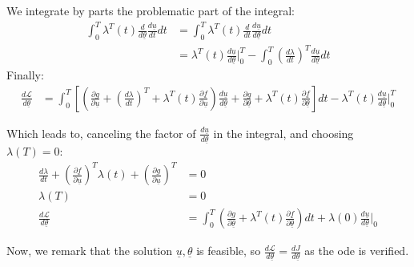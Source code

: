     We integrate by parts the problematic part of the integral:
\begin{align}
    \int_{0}^{T} \lambda^{T}(t) \frac{d}{d \underline{\theta}} \frac{d \underline{u}}{dt} dt &=
        \int_{0}^{T} \lambda^{T}(t) \frac{d}{dt} \frac{d \underline{u}}{d \underline{\theta}} dt \\
        &= \lambda^{T}(t)\frac{d \underline{u}}{d \underline{\theta}} \vert^{T}_{0} - \int_{0}^{T} \left( \frac{d \lambda}{dt} \right)^{T} \frac{d \underline{u}}{d \underline{\theta}} dt
\end{align}
Finally:
\begin{align}
    \frac{d \mathcal{L}}{d \underline{\theta}} &= \int_{0}^{T} \left[
        \left( \frac{\partial g}{\partial \underline{u}} + \left( \frac{d \lambda}{dt} \right)^{T} + \lambda^{T}(t) \frac{\partial \underline{f}}{\partial \underline{u}}\right) 
            \frac{d \underline{u}}{d \underline{\theta}} + \frac{\partial g}{\partial \underline{\theta}} + \lambda^{T}(t) \frac{\partial \underline{f}}{\partial \underline{\theta}} \right] dt
            - \lambda^{T}(t)\frac{d \underline{u}}{d \underline{\theta}} \vert^{T}_{0}
\end{align}

Which leads to, canceling the factor of $\frac{d \underline{u}}{d \underline{\theta}}$ in the integral, and choosing $\lambda(T)=0$:
\begin{align}
    \frac{d \lambda}{dt} + \left( \frac{\partial \underline{f}}{\partial \underline{u}}\right)^{T} \lambda(t) + \left( \frac{\partial g}{\partial \underline{u}}\right)^{T} &= 0 \\
    \lambda(T) &= 0 \\
    \frac{d \mathcal{L}}{d \underline{\theta}} &= \int_{0}^{T} \left( \frac{\partial g}{\partial \underline{\theta}} + \lambda^{T}(t) \frac{\partial \underline{f}}{\partial \underline{\theta}} \right) dt
    + \lambda(0) \frac{d \underline{u}}{d \underline{\theta}} \vert_{0}
\end{align}

    Now, we remark that the solution $\underline{u}, \underline{\theta}$ is feasible, so $\frac{d \mathcal{L}}{d \underline{\theta}} = \frac{dJ}{d \underline{\theta}}$ as the \gls{ode} is verified.

